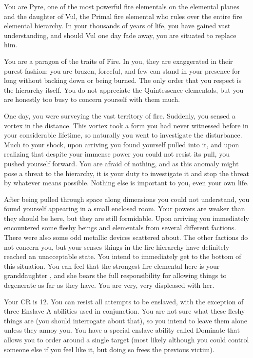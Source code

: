\documentclass[green]{elementals}
\begin{document}
\name{\cElder{}}

You are Pyre, one of the most powerful fire elementals on the elemental planes and the daughter of Vul, the Primal fire elemental who rules over the entire fire elemental hierarchy. In your thousands of years of life, you have gained vast understanding, and should Vul one day fade away, you are situated to replace him.

You are a paragon of the traits of Fire. In you, they are exaggerated in their purest fashion: you are brazen, forceful, and few can stand in your presence for long without backing down or being burned. The only order that you respect is the hierarchy itself. You do not appreciate the Quintessence elementals, but you are honestly too busy to concern yourself with them much.

One day, you were surveying the vast territory of fire. Suddenly, you sensed a vortex in the distance. This vortex took a form you had never witnessed before in your considerable lifetime, so naturally you went to investigate the disturbance. Much to your shock, upon arriving you found yourself pulled into it, and upon realizing that despite your immense power you could not resist its pull, you pushed yourself forward. You are afraid of nothing, and as this anomaly might pose a threat to the hierarchy, it is your duty to investigate it and stop the threat by whatever means possible. Nothing else is important to you, even your own life.

After being pulled through space along dimensions you could not understand, you found yourself appearing in a small enclosed room. Your powers are weaker than they should be here, but they are still formidable. Upon arriving you immediately encountered some fleshy beings and elementals from several different factions. There were also some odd metallic devices scattered about. The other factions do not concern you, but your senses things in the fire hierarchy have definitely reached an unacceptable state. You intend to immediately get to the bottom of this situation. You can feel that the strongest fire elemental here is your granddaughter \cQueen{\intro}, and she bears the full responsibility for allowing things to degenerate as far as they have. You are very, very displeased with her.

Your CR is 12. You can resist all attempts to be enslaved, with the exception of three Enslave A abilities used in conjunction. You are not sure what these fleshy things are (you should interrogate \cQueen{} about that), so you intend to leave them alone unless they annoy you. You have a special enslave ability called Dominate that allows you to order around a single target (most likely \cQueen{} although you could control someone else if you feel like it, but doing so frees the previous victim).
\end{document}
